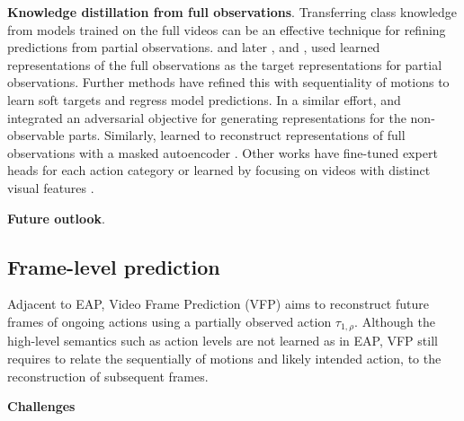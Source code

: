 \documentclass[smallextended,twocolumn,natbib]{svjour3}
\begin{document}
\noindent
\textbf{Knowledge distillation from full observations}. Transferring class knowledge \citep{park2019relational} from models trained on the full videos can be an effective technique for refining predictions from partial observations. \citet{cai2019action} and later \citet{fernando2021anticipating}, and \citet{wang2019progressive}, used learned representations of the full observations as the target representations for partial observations. Further methods \citep{hou2020confidence} have refined this with sequentiality of motions to learn soft targets and regress model predictions. In a similar effort, \citep{xu2019prediction} and \citep{zheng2023egocentric} integrated an adversarial objective for generating representations for the non-observable parts. Similarly, \citet{xu2023dynamic} learned to reconstruct representations of full observations with a masked autoencoder \citep{he2022masked}. Other works have fine-tuned expert heads for each action category \citep{foo2022era} or learned by focusing on videos with distinct visual features \citep{hu2018early}.

\noindent
\textbf{Future outlook}.








\subsection{Frame-level prediction}

Adjacent to EAP, Video Frame Prediction (VFP) aims to reconstruct future frames of ongoing actions using a partially observed action $\tau_{1,\rho}$. Although the high-level semantics such as action levels are not learned as in EAP, VFP still requires to relate the sequentially of motions and likely intended action, to the reconstruction of subsequent frames.

\noindent
\textbf{Challenges}
\end{document}
